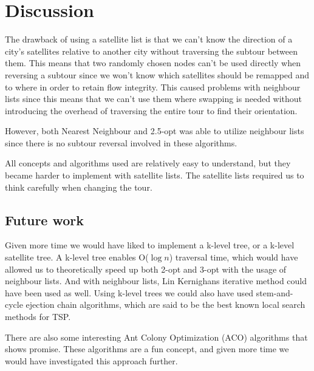\documentclass[paper=a4, fontsize=11pt,numbers=endperiod]{scrartcl} %
\numberwithin{equation}{section} %
\numberwithin{figure}{section} %
\numberwithin{table}{section} %
\begin{document}
\section{Discussion}


The drawback of using a satellite list is that we can't know the direction of a city's satellites relative to another city without traversing the subtour between them.
This means that two randomly chosen nodes can't be used directly when reversing a subtour since we won't know which satellites should be remapped and to where in order to retain flow integrity.
This caused problems with neighbour lists since this means that we can't use them where swapping is needed without introducing the overhead of traversing the entire tour to find their orientation.

However, both Nearest Neighbour and 2.5-opt was able to utilize neighbour lists since there is no subtour reversal involved in these algorithms.

All concepts and algorithms used are relatively easy to understand, but they became harder to implement with satellite lists.
The satellite lists required us to think carefully when changing the tour.


\subsection{Future work}

Given more time we would have liked to implement a k-level tree, or a k-level satellite tree.
A k-level tree enables O($\log{n}$) traversal time, which would have allowed us to theoretically speed up both 2-opt and 3-opt with the usage of neighbour lists. And with neighbour lists, Lin Kernighans iterative method could have been used as well. Using k-level trees we could also have used stem-and-cycle ejection chain algorithms, which are said to be the best known local search methods for TSP.\cite{stem-cycle}

There are also some interesting Ant Colony Optimization (ACO) algorithms that shows promise. These algorithms are a fun concept, and given more time we would have investigated this approach further. \cite{ACO}

\end{document}
